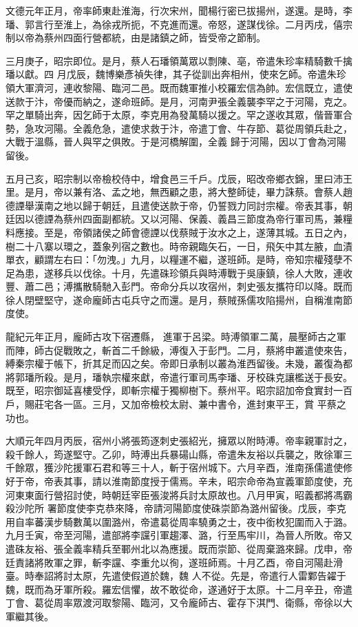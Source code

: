 \begin{pinyinscope}
 文德元年正月，帝率師東赴淮海，行次宋州，聞楊行密已拔揚州，遂還。是時，李璠、郭言行至淮上，為徐戎所扼，不克進而還。帝怒，遂謀伐徐。二月丙戌，僖宗制以帝為蔡州四面行營都統，由是諸鎮之師，皆受帝之節制。



 三月庚子，昭宗即位。是月，蔡人石璠領萬眾以剽陳、亳，帝遣朱珍率精騎數千擒璠以獻。四
 月戊辰，魏博樂彥禎失律，其子從訓出奔相州，使來乞師。帝遣朱珍領大軍濟河，連收黎陽、臨河二邑。既而魏軍推小校羅宏信為帥。宏信既立，遣使送款于汴，帝優而納之，遂命班師。是月，河南尹張全義襲李罕之于河陽，克之。罕之單騎出奔，因乞師于太原，李克用為發萬騎以援之。罕之遂收其眾，偕晉軍合勢，急攻河陽。全義危急，遣使求救于汴，帝遣丁會、牛存節、葛從周領兵赴之，大戰于溫縣，晉人與罕之俱敗。于是河橋解圍，全義
 歸于河陽，因以丁會為河陽留後。



 五月己亥，昭宗制以帝檢校侍中，增食邑三千戶。戊辰，昭改帝鄉衣錦，里曰沛王里。是月，帝以兼有洛、孟之地，無西顧之患，將大整師徒，畢力誅蔡。會蔡人趙德諲舉漢南之地以歸于朝廷，且遣使送款于帝，仍誓戮力同討宗權。帝表其事，朝廷因以德諲為蔡州四面副都統。又以河陽、保義、義昌三節度為帝行軍司馬，兼糧料應接。至是，帝領諸侯之師會德諲以伐蔡賊于汝水之上，遂薄其城。五日之內，
 樹二十八寨以環之，蓋象列宿之數也。時帝親臨矢石，一日，飛矢中其左腋，血漬單衣，顧謂左右曰：「勿洩。」九月，以糧運不繼，遂班師。是時，帝知宗權殘孽不足為患，遂移兵以伐徐。十月，先遣硃珍領兵與時溥戰于吳康鎮，徐人大敗，連收豐、蕭二邑；溥攜散騎馳入彭門。帝命分兵以攻宿州，刺史張友攜符印以降。既而徐人閉壁堅守，遂命龐師古屯兵守之而還。是月，蔡賊孫儒攻陷揚州，自稱淮南節度使。



 龍紀元年正月，龐師古攻下宿遷縣，
 進軍于呂梁。時溥領軍二萬，晨壓師古之軍而陣，師古促戰敗之，斬首二千餘級，溥復入于彭門。二月，蔡將申叢遣使來告，縛秦宗權于帳下，折其足而囚之矣。帝即日承制以叢為淮西留後。未幾，叢復為都將郭璠所殺。是月，璠執宗權來獻，帝遣行軍司馬李璠、牙校硃克讓檻送于長安。既至，昭宗御延喜樓受俘，即斬宗權于獨柳樹下。蔡州平。昭宗詔加帝食實封一百戶，賜莊宅各一區。三月，又加帝檢校太尉、兼中書令，進封東平王，賞
 平蔡之功也。



 大順元年四月丙辰，宿州小將張筠逐刺史張紹光，擁眾以附時溥。帝率親軍討之，殺千餘人，筠遂堅守。乙卯，時溥出兵暴碭山縣，帝遣朱友裕以兵襲之，敗徐軍三千餘眾，獲沙陀援軍石君和等三十人，斬于宿州城下。六月辛酉，淮南孫儒遣使修好于帝，帝表其事，請以淮南節度授于儒焉。辛未，昭宗命帝為宣義軍節度使，充河東東面行營招討使，時朝廷宰臣張浚將兵討太原故也。八月甲寅，昭義都將馮霸殺沙陀所
 署節度使李克恭來降，帝請河陽節度使硃崇節為潞州留後。戊辰，李克用自率蕃漢步騎數萬以圍潞州，帝遣葛從周率驍勇之士，夜中銜枚犯圍而入于潞。九月壬寅，帝至河陽，遣部將李讜引軍趨澤、潞，行至馬牢川，為晉人所敗。帝又遣硃友裕、張全義率精兵至鄆州北以為應援。既而崇節、從周棄潞來歸。戊申，帝廷責諸將敗軍之罪，斬李讜、李重允以徇，遂班師焉。十月乙酉，帝自河陽赴滑臺。時奉詔將討太原，先遣使假道於魏，魏
 人不從。先是，帝遣行人雷鄴告糴于魏，既而為牙軍所殺。羅宏信懼，故不敢從命，遂通好于太原。十二月辛丑，帝遣丁會、葛從周率眾渡河取黎陽、臨河，又令龐師古、霍存下淇門、衛縣，帝徐以大軍繼其後。




\end{pinyinscope}
